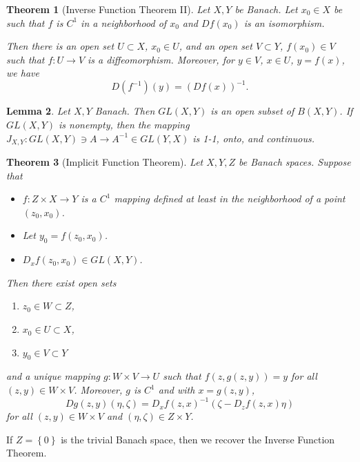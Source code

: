 \documentclass[letterpaper,twoside,12pt]{article}
\theoremstyle{mystyle}
\newtheorem{theorem}{Theorem}[section]
\newtheorem{lemma}[theorem]{Lemma}
\newcommand{\inv}{^{-1}}
\begin{document}
  \begin{tcolorbox}[colback=red!5!white,colframe=red!75!black]
    \begin{theorem}[Inverse Function Theorem II]
      Let \(X, Y\) be Banach. Let \(x_0 \in X\) be such that \(f\) is $C^1$ in a neighborhood of \(x_0\) and $Df(x_0)$ is an isomorphism. 

      Then there is an open set $U \subset X$, $x_0 \in U$, and an open set $V\subset Y$, $f(x_0) \in V$ such that $f:U\to V$ is a diffeomorphism. Moreover, for $y \in V$, $x \in U$, $y = f(x)$, we have 
      \[D(f\inv)(y) = (Df(x))\inv.\]
    \end{theorem}
  \end{tcolorbox}

  \begin{tcolorbox}[colback=red!5!white,colframe=red!75!black]
    \begin{lemma}
      Let $X, Y$ Banach. Then $GL(X, Y)$ is an open subset of $B(X, Y)$. If $GL(X, Y)$ is nonempty, then the mapping $J_{X,Y}: GL(X, Y) \ni A \to A\inv \in GL(Y, X)$ is 1-1, onto, and continuous. 
    \end{lemma}
  \end{tcolorbox}

  \begin{tcolorbox}[colback=red!5!white,colframe=red!75!black]
    \begin{theorem}[Implicit Function Theorem]
      Let \(X, Y, Z\) be Banach spaces. Suppose that 
      \begin{itemize}
        \item $f:Z\times X \to Y$ is a $C^1$ mapping defined at least in the neighborhood of a point $(z_0, x_0)$. 
        \item Let $y_0 = f(z_0, x_0)$.
        \item $D_xf(z_0, x_0) \in GL(X, Y)$.
      \end{itemize}
      Then there exist open sets 
      \begin{enumerate}
        \item $z_0 \in W\subset Z$,
        \item $x_0 \in U \subset X$, 
        \item $y_0 \in V\subset Y$
      \end{enumerate}
      and a unique mapping $g : W \times V \to U$ such that $f(z, g(z, y)) = y$ for all $(z, y) \in W \times V$. Moreover, $g$ is $C^1$ and with $x = g(z, y)$, 
      \[Dg(z, y)(\eta, \zeta) = D_xf(z, x)\inv \left( \zeta - D_zf(z, x)\eta \right)\]
      for all $(z, y) \in W \times V$ and $(\eta, \zeta) \in Z \times Y$. 
    \end{theorem}
  \end{tcolorbox}
  If $Z = \left\{ 0 \right\}$ is the trivial Banach space, then we recover the Inverse Function Theorem. 
\end{document}

